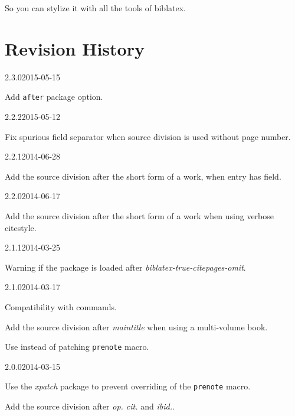 \documentclass{ltxdockit}[2011/03/25]
\begin{document}
So you can stylize it with all the tools of biblatex. 



\section{Revision History}
\begin{changelog}

\begin{release}{2.3.0}{2015-05-15}
\item Add \verb+after+ package option. 
\end{release}

\begin{release}{2.2.2}{2015-05-12}
\item Fix spurious field separator when source division is used without page number.
\end{release}

\begin{release}{2.2.1}{2014-06-28}
\item Add the source division after the short form of a work, when entry has  field.
\end{release}

\begin{release}{2.2.0}{2014-06-17}
\item Add the source division after the short form of a work when using verbose citestyle.
\end{release}

\begin{release}{2.1.1}{2014-03-25}
\item Warning if the package is loaded after \emph{bibla­tex-true-citepages-omit}.
\end{release}

\begin{release}{2.1.0}{2014-03-17}
\item Compatibility with  commands.
\item Add the source division after \emph{maintitle} when using a multi-volume book.
\item Use  instead of patching \verb+prenote+ macro.
\end{release}


\begin{release}{2.0.0}{2014-03-15}
\item Use the \emph{xpatch} package to prevent overriding of the  \verb+prenote+ macro.
\item Add the source division after \emph{op. cit.} and \emph{ibid.}.
\end{release}



\end{changelog}
\end{document}

